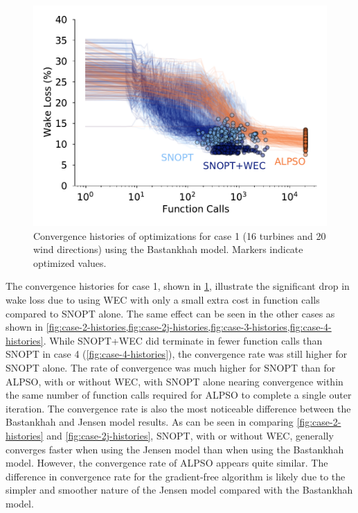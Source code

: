 \documentclass{jpconf}
\begin{document}
\begin{figure}[h!]
	\centering
	\begin{minipage}[t]{.45\textwidth}
		\centering
		\includegraphics[width=\textwidth]{final_images/results/convergence_history_BPAmodel_16turbs_20dirs}  
		\caption{Convergence histories of optimizations for case 1 (16 turbines and 20 wind directions) using the Bastankhah model. Markers indicate optimized values.}
		\label{fig:case-1-histories}
	\end{minipage}
\end{figure}

The convergence histories for case 1, shown in \cref{fig:case-1-histories}, illustrate the significant drop in wake loss due to using WEC with only a small extra cost in function calls compared to SNOPT alone. The same effect can be seen in the other cases as shown in \cref{fig:case-2-histories,fig:case-2j-histories,fig:case-3-histories,fig:case-4-histories}. While SNOPT+WEC did terminate in fewer function calls than SNOPT in case 4 (\cref{fig:case-4-histories}), the convergence rate was still higher for SNOPT alone. The rate of convergence was much higher for SNOPT than for ALPSO, with or without WEC, with SNOPT alone nearing convergence within the same number of function calls required for ALPSO to complete a single outer iteration. The convergence rate is also the most noticeable difference between the Bastankhah and Jensen model results. As can be seen in comparing \cref{fig:case-2-histories} and \cref{fig:case-2j-histories}, SNOPT, with or without WEC, generally converges faster when using the Jensen model than when using the Bastankhah model. However, the convergence rate of ALPSO appears quite similar. The difference in convergence rate for the gradient-free algorithm is likely due to the simpler and smoother nature of the Jensen model compared with the Bastankhah model.
\end{document}
